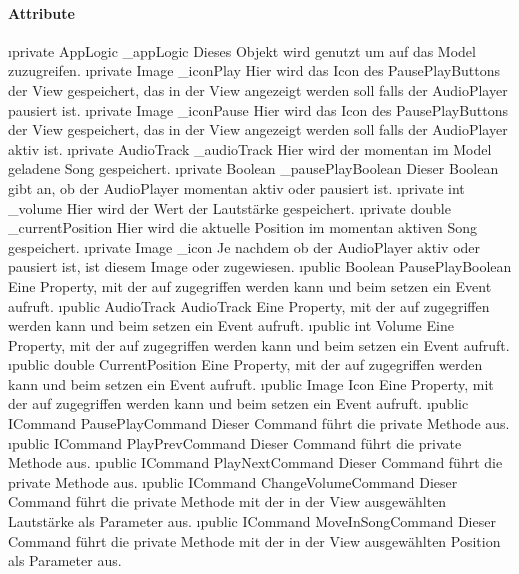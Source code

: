 \documentclass[../entwurf.tex]{subfiles}
\begin{document}
\paragraph{Attribute}
\begin{itemize}
	\i{private AppLogic \_appLogic} Dieses Objekt wird genutzt um auf das Model zuzugreifen.
	\i{private Image \_iconPlay} Hier wird das Icon des PausePlayButtons der View gespeichert, das in der View angezeigt werden soll falls der AudioPlayer pausiert ist.
	\i{private Image \_iconPause} Hier wird das Icon des PausePlayButtons der View gespeichert, das in der View angezeigt werden soll falls der AudioPlayer aktiv ist.
	\i{private AudioTrack \_audioTrack} Hier wird der momentan im Model geladene Song gespeichert.
	\i{private Boolean \_pausePlayBoolean} Dieser Boolean gibt an, ob der AudioPlayer momentan aktiv oder pausiert ist.
	\i{private int \_volume} Hier wird der Wert der Lautstärke gespeichert.
	\i{private double \_currentPosition} Hier wird die aktuelle Position im momentan aktiven Song gespeichert.
	\i{private Image \_icon} Je nachdem ob der AudioPlayer aktiv oder pausiert ist, ist diesem Image  oder  zugewiesen.
	\i{public Boolean PausePlayBoolean} Eine Property, mit der auf  zugegriffen werden kann und beim setzen ein Event aufruft.
	\i{public AudioTrack AudioTrack} Eine Property, mit der auf  zugegriffen werden kann und beim setzen ein Event aufruft.
	\i{public int Volume} Eine Property, mit der auf  zugegriffen werden kann und beim setzen ein Event aufruft.
	\i{public double CurrentPosition} Eine Property, mit der auf  zugegriffen werden kann und beim setzen ein Event aufruft.
	\i{public Image Icon} Eine Property, mit der auf  zugegriffen werden kann und beim setzen ein Event aufruft.
	\i{public ICommand PausePlayCommand} Dieser Command führt die private Methode  aus.
	\i{public ICommand PlayPrevCommand} Dieser Command führt die private Methode  aus.
	\i{public ICommand PlayNextCommand} Dieser Command führt die private Methode  aus.
	\i{public ICommand ChangeVolumeCommand} Dieser Command führt die private Methode  mit der in der View ausgewählten Lautstärke als Parameter aus.
	\i{public ICommand MoveInSongCommand} Dieser Command führt die private Methode  mit der in der View ausgewählten Position als Parameter aus.
\end{itemize}
\end{document}
